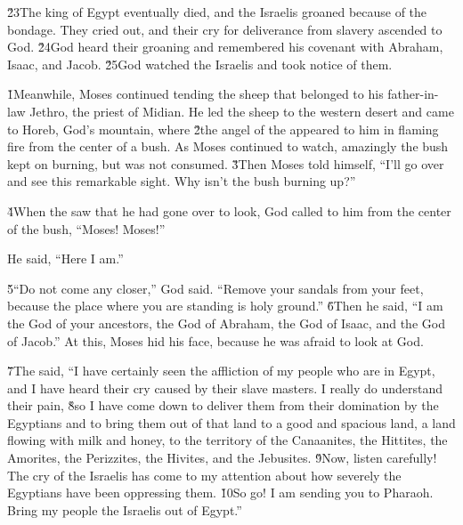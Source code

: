 \v{23}The king of Egypt eventually died, and the Israelis groaned because of the bondage. They cried out, and their cry for deliverance from slavery ascended to God. \v{24}God heard their groaning and remembered his covenant with Abraham, Isaac, and Jacob. \v{25}God watched the Israelis and took notice of them.

\v{1}Meanwhile, Moses continued tending the sheep that belonged to his father-in-law Jethro, the priest of Midian. He led the sheep to the western desert and came to Horeb, God's mountain, where \v{2}the angel of the  appeared to him in flaming fire from the center of a bush. As Moses continued to watch, amazingly the bush kept on burning, but was not consumed. \v{3}Then Moses told himself, ``I'll go over and see this remarkable sight. Why isn't the bush burning up?''

\v{4}When the  saw that he had gone over to look, God called to him from the center of the bush, ``Moses! Moses!''

He said, ``Here I am.''

\v{5}``Do not come any closer,'' God said. ``Remove your sandals from your feet, because the place where you are standing is holy ground.'' \v{6}Then he said, ``I am the God of your ancestors, the God of Abraham, the God of Isaac, and the God of Jacob.'' At this, Moses hid his face, because he was afraid to look at God.

\v{7}The  said, ``I have certainly seen the affliction of my people who are in Egypt, and I have heard their cry caused by their slave masters. I really do understand their pain, \v{8}so I have come down to deliver them from their domination by the Egyptians and to bring them out of that land to a good and spacious land, a land flowing with milk and honey, to the territory of the Canaanites, the Hittites, the Amorites, the Perizzites, the Hivites, and the Jebusites. \v{9}Now, listen carefully! The cry of the Israelis has come to my attention about how severely the Egyptians have been oppressing them. \v{10}So go! I am sending you to Pharaoh. Bring my people the Israelis out of Egypt.''

